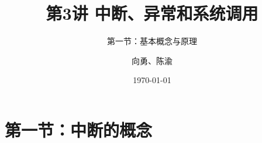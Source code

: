 


\title[第3讲]{第3讲 中断、异常和系统调用} %
\subtitle{第一节：基本概念与原理}
\author{向勇、陈渝} %
\date{\today} %



\begin{frame}
\titlepage %
\end{frame}


\section{第一节：中断的概念}%

